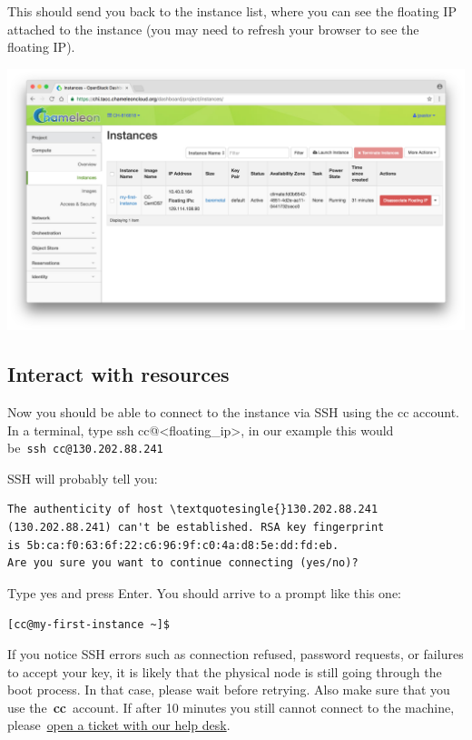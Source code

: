 This should send you back to the instance list, where you can see the
floating IP attached to the instance (you may need to refresh your
browser to see the floating IP).

\includegraphics[width=0.8\columnwidth]{images/chameleon/Screen-Shot-2016-10-26-at-16-26-54.png}

\subsection{Interact with resources}

Now you should be able to connect to the instance via SSH using the cc
account. In a terminal, type ssh
cc@\textless{}floating\_ip\textgreater{}, in our example this would
be~\texttt{ssh\ cc@130.202.88.241}

SSH will probably tell you:

\begin{verbatim}
The authenticity of host \textquotesingle{}130.202.88.241
(130.202.88.241) can't be established. RSA key fingerprint 
is 5b:ca:f0:63:6f:22:c6:96:9f:c0:4a:d8:5e:dd:fd:eb. 
Are you sure you want to continue connecting (yes/no)?

\end{verbatim}

Type yes and press Enter. You should arrive to a prompt like this one:

\texttt{{[}cc@my-first-instance\ \textasciitilde{}{]}\$}

If you notice SSH errors such as connection refused, password requests,
or failures to accept your key, it is likely that the physical node is
still going through the boot process. In that case, please wait before
retrying. Also make sure that you use the~\textbf{cc}~account. If after
10 minutes you still cannot connect to the machine,
please~\href{https://www.chameleoncloud.org/user/help/}{open a ticket
with our help desk}.

